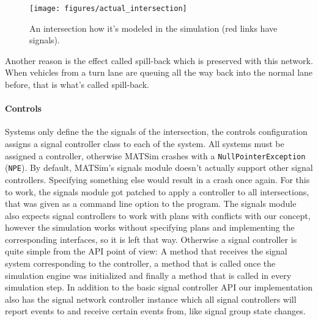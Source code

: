 \begin{figure}[ht!]
	\centering
	\texttt{[image: figures/actual\_intersection]}
	\caption{An intersection how it's modeled in the simulation (red links have signals).}
	\label{actual_intersection}
\end{figure}

Another reason is the effect called spill-back which is preserved with this network. When vehicles from a turn lane are queuing all the way back into the normal lane before, that is what's called spill-back. \cite{matsim}

\paragraph{Controls} Systems only define the the signals of the intersection, the controls configuration assigns a signal controller class to each of the system. All systems must be assigned a controller, otherwise MATSim crashes with a \texttt{NullPointerException} (\texttt{NPE}). By default, MATSim's signals module doesn't actually support other signal controllers. Specifying something else would result in a crash once again. For this to work, the signals module got patched to apply a controller to all intersections, that was given as a command line option to the program. The signals module also expects signal controllers to work with plans with conflicts with our concept, however the simulation works without specifying plans and implementing the corresponding interfaces, so it is left that way. Otherwise a signal controller is quite simple from the API point of view: A method that receives the signal system corresponding to the controller, a method that is called once the simulation engine was initialized and finally a method that is called in every simulation step. In addition to the basic signal controller API our implementation also has the signal network controller instance which all signal controllers will report events to and receive certain events from, like signal group state changes.

